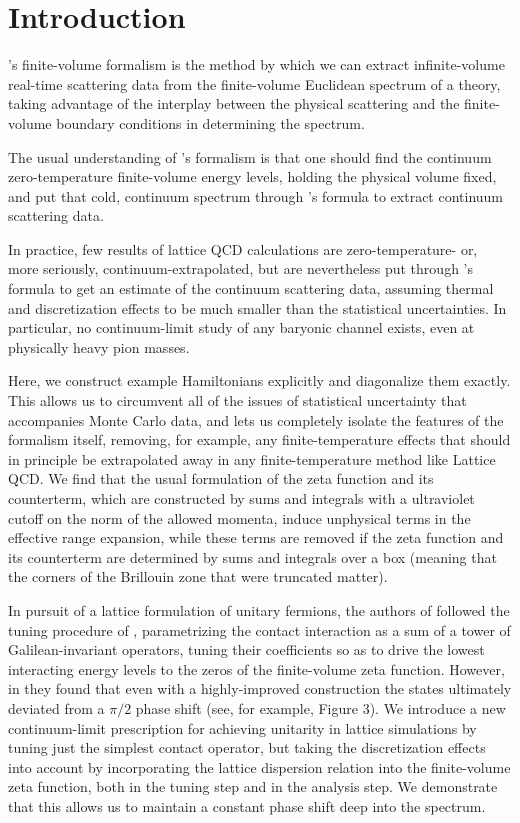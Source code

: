 \section{Introduction}\label{sec:intro}

\Luscher's finite-volume formalism\cite{Hamber198399,luscher:1986I,luscher:1986II,wiese1989,Luscher1991,Luscher1991237} is the method by which we can extract infinite-volume real-time scattering data from the finite-volume Euclidean spectrum of a theory, taking advantage of the interplay between the physical scattering and the finite-volume boundary conditions in determining the spectrum.

The usual understanding of \Luscher's formalism is that one should find the continuum zero-temperature finite-volume energy levels, holding the physical volume fixed, and put that cold, continuum spectrum through \Luscher's formula to extract continuum scattering data.

In practice, few results of lattice QCD calculations are zero-temperature- or, more seriously, continuum-extrapolated, but are nevertheless put through \Luscher's formula to get an estimate of the continuum scattering data, assuming thermal and discretization effects to be much smaller than the statistical uncertainties.
In particular, no continuum-limit study of any baryonic channel exists, even at physically heavy pion masses.

Here, we construct example Hamiltonians explicitly and diagonalize them exactly.
This allows us to circumvent all of the issues of statistical uncertainty that accompanies Monte Carlo data, and lets us completely isolate the features of the formalism itself, removing, for example, any finite-temperature effects that should in principle be extrapolated away in any finite-temperature method like Lattice QCD.
We find that the usual formulation of the \Luscher zeta function and its counterterm, which are constructed by sums and integrals with a ultraviolet cutoff on the norm of the allowed momenta, induce unphysical terms in the effective range expansion, while these terms are removed if the zeta function and its counterterm are determined by sums and integrals over a box (meaning that the corners of the Brillouin zone that were truncated matter).

In pursuit of a lattice formulation of unitary fermions, the authors of  followed the tuning procedure of , parametrizing the contact interaction as a sum of a tower of Galilean-invariant operators, tuning their coefficients so as to drive the lowest interacting energy levels to the zeros of the \Luscher finite-volume zeta function.
However, in  they found that even with a highly-improved construction the states ultimately deviated from a $\pi/2$ phase shift (see, for example, Figure 3).
We introduce a new continuum-limit prescription for achieving unitarity in lattice simulations by tuning just the simplest contact operator, but taking the discretization effects into account by incorporating the lattice dispersion relation into the finite-volume zeta function, both in the tuning step and in the analysis step.
We demonstrate that this allows us to maintain a constant phase shift deep into the spectrum.


